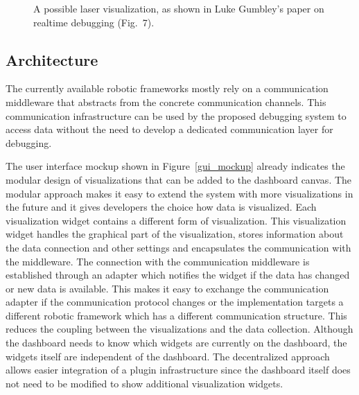 \begin{figure}%
  \centering
  \caption{A possible laser visualization, as shown in Luke Gumbley's paper on realtime debugging (Fig.~7). \cite{Gumbley2009}}
  \label{laser_viz}
\end{figure}

\subsection{Architecture}
The currently available robotic frameworks mostly rely on a communication middleware that abstracts from the concrete communication channels. This communication infrastructure can be used by the proposed debugging system to access data without the need to develop a dedicated communication layer for debugging.

The user interface mockup shown in Figure~\ref{gui_mockup} already indicates the modular design of visualizations that can be added to the dashboard canvas. The modular approach makes it easy to extend the system with more visualizations in the future and it gives developers the choice how data is visualized. Each visualization widget contains a different form of visualization. This visualization widget handles the graphical part of the visualization, stores information about the data connection and other settings and encapsulates the communication with the middleware. The connection with the communication middleware is established through an adapter which notifies the widget if the data has changed or new data is available. This makes it easy to exchange the communication adapter if the communication protocol changes or the implementation targets a different robotic framework which has a different communication structure. This reduces the coupling between the visualizations and the data collection. Although the dashboard needs to know which widgets are currently on the dashboard, the widgets itself are independent of the dashboard. The decentralized approach allows easier integration of a plugin infrastructure since the dashboard itself does not need to be modified to show additional visualization widgets.

